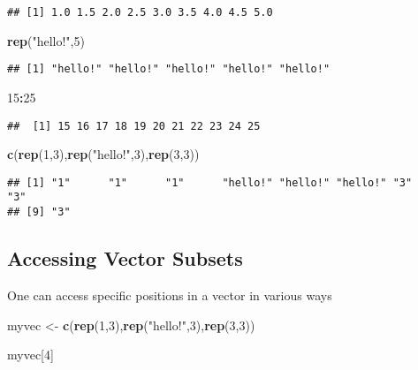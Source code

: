 \documentclass[
]{book}
\newenvironment{Shaded}{\begin{snugshade}}{\end{snugshade}}
\newcommand{\DecValTok}[1]{\textcolor[rgb]{0.00,0.00,0.81}{#1}}
\newcommand{\FunctionTok}[1]{\textcolor[rgb]{0.13,0.29,0.53}{\textbf{#1}}}
\newcommand{\NormalTok}[1]{#1}
\newcommand{\OtherTok}[1]{\textcolor[rgb]{0.56,0.35,0.01}{#1}}
\newcommand{\SpecialCharTok}[1]{\textcolor[rgb]{0.81,0.36,0.00}{\textbf{#1}}}
\newcommand{\StringTok}[1]{\textcolor[rgb]{0.31,0.60,0.02}{#1}}
\begin{document}
\begin{verbatim}
## [1] 1.0 1.5 2.0 2.5 3.0 3.5 4.0 4.5 5.0
\end{verbatim}

\begin{Shaded}
\begin{Highlighting}[]
\FunctionTok{rep}\NormalTok{(}\StringTok{"hello!"}\NormalTok{,}\DecValTok{5}\NormalTok{)}
\end{Highlighting}
\end{Shaded}

\begin{verbatim}
## [1] "hello!" "hello!" "hello!" "hello!" "hello!"
\end{verbatim}

\begin{Shaded}
\begin{Highlighting}[]
\DecValTok{15}\SpecialCharTok{:}\DecValTok{25}
\end{Highlighting}
\end{Shaded}

\begin{verbatim}
##  [1] 15 16 17 18 19 20 21 22 23 24 25
\end{verbatim}

\begin{Shaded}
\begin{Highlighting}[]
\FunctionTok{c}\NormalTok{(}\FunctionTok{rep}\NormalTok{(}\DecValTok{1}\NormalTok{,}\DecValTok{3}\NormalTok{),}\FunctionTok{rep}\NormalTok{(}\StringTok{"hello!"}\NormalTok{,}\DecValTok{3}\NormalTok{),}\FunctionTok{rep}\NormalTok{(}\DecValTok{3}\NormalTok{,}\DecValTok{3}\NormalTok{))}
\end{Highlighting}
\end{Shaded}

\begin{verbatim}
## [1] "1"      "1"      "1"      "hello!" "hello!" "hello!" "3"      "3"     
## [9] "3"
\end{verbatim}

\subsection{Accessing Vector Subsets}\label{accessing-vector-subsets}

One can access specific positions in a vector in various ways

\begin{Shaded}
\begin{Highlighting}[]
\NormalTok{myvec }\OtherTok{\textless{}{-}} \FunctionTok{c}\NormalTok{(}\FunctionTok{rep}\NormalTok{(}\DecValTok{1}\NormalTok{,}\DecValTok{3}\NormalTok{),}\FunctionTok{rep}\NormalTok{(}\StringTok{"hello!"}\NormalTok{,}\DecValTok{3}\NormalTok{),}\FunctionTok{rep}\NormalTok{(}\DecValTok{3}\NormalTok{,}\DecValTok{3}\NormalTok{))}

\NormalTok{myvec[}\DecValTok{4}\NormalTok{]}
\end{Highlighting}
\end{Shaded}
\end{document}
